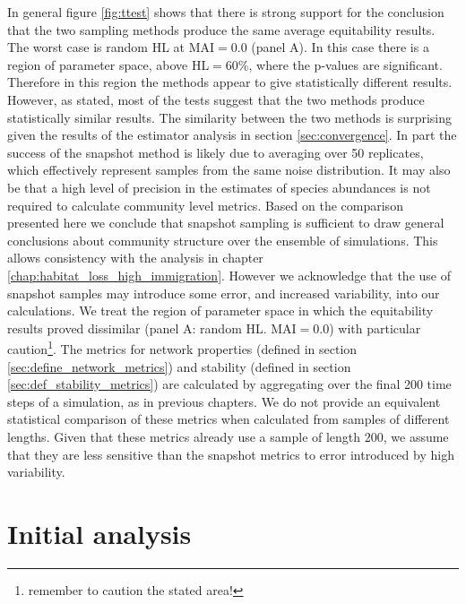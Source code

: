 In general figure \ref{fig:ttest} shows that there is strong support for the conclusion that the two sampling methods produce the same average equitability results. The worst case is random HL at MAI$=0.0$ (panel A). In this case there is a region of parameter space, above HL$=60\%$, where the p-values are significant. Therefore in this region the methods appear to give statistically different results. However, as stated, most of the tests suggest that the two methods produce statistically similar results. The similarity between the two methods is surprising given the results of the estimator analysis in section \ref{sec:convergence}. In part the success of the snapshot method is likely due to averaging over 50 replicates, which effectively represent samples from the same noise distribution. It may also be that a high level of precision in the estimates of species abundances is not required to calculate community level metrics. Based on the comparison presented here we conclude that snapshot sampling is sufficient to draw general conclusions about community structure over the ensemble of simulations. This allows consistency with the analysis in chapter \ref{chap:habitat_loss_high_immigration}. However we acknowledge that the use of snapshot samples may introduce some error, and increased variability, into our calculations. We treat the region of parameter space in which the equitability results proved dissimilar (panel A: random HL. MAI$=0.0$) with particular caution\footnote{remember to caution the stated area!}. The metrics for network properties (defined in section \ref{sec:define_network_metrics}) and stability (defined in section \ref{sec:def_stability_metrics}) are calculated by aggregating over the final 200 time steps of a simulation, as in previous chapters. We do not provide an equivalent statistical comparison of these metrics when calculated from samples of different lengths. Given that these metrics already use a sample of length 200, we assume that they are less sensitive than the snapshot metrics to error introduced by high variability.   

\section{Initial analysis}
\label{sec:init_res}

